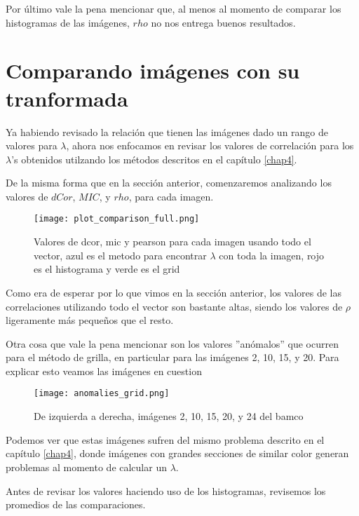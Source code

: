         Por \'ultimo vale la pena mencionar que, al menos al momento de comparar los histogramas de las im\'agenes, $rho$ no nos entrega buenos resultados. 


\section{Comparando im\'agenes con su tranformada}

    Ya habiendo revisado la relaci\'on que tienen las im\'agenes dado un rango de valores para $\lambda$, ahora nos enfocamos en revisar los valores de correlaci\'on para los $\lambda$'s obtenidos utilzando los m\'etodos descritos en el cap\'itulo \ref{chap4}. 
    
    De la misma forma que en la secci\'on anterior, comenzaremos analizando los valores de $dCor$, $MIC$, y $rho$, para cada imagen.
    
    \begin{figure}[H]
        \centering
        \texttt{[image: plot\_comparison\_full.png]}
        \caption{Valores de dcor, mic y pearson para cada imagen usando todo el vector, azul es el metodo para encontrar $\lambda$ con toda la imagen, rojo es el histograma y verde es el grid}
    \end{figure}

    Como era de esperar por lo que vimos en la secci\'on anterior, los valores de las correlaciones utilizando todo el vector son bastante altas, siendo los valores de $\rho$ ligeramente m\'as peque\~nos que el resto. 

    Otra cosa que vale la pena mencionar son los valores ''an\'omalos'' que ocurren para el m\'etodo de grilla, en particular para las im\'agenes 2, 10, 15, y 20. Para explicar esto veamos las im\'agenes en cuestion

    \begin{figure}[H]
        \centering
        \texttt{[image: anomalies\_grid.png]}
        \caption{De izquierda a derecha, im\'agenes 2, 10, 15, 20, y 24 del bamco \cite{KodakLosslessTrueColorImageSuite}}
    \end{figure}

    Podemos ver que estas im\'agenes sufren del mismo problema descrito en el cap\'itulo \ref{chap4}, donde im\'agenes con grandes secciones de similar color generan problemas al momento de calcular un $\lambda$.

    Antes de revisar los valores haciendo uso de los histogramas, revisemos los promedios de las comparaciones. 

